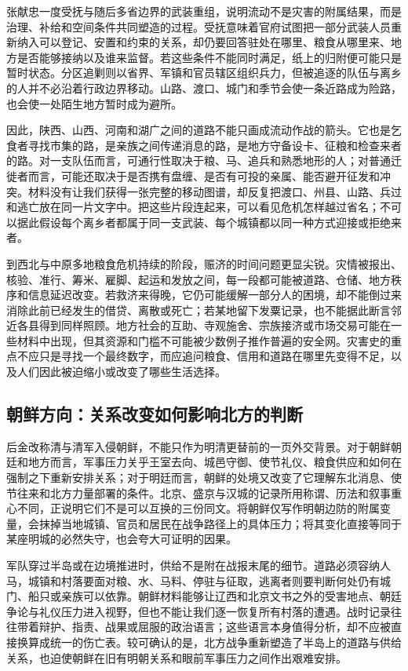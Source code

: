 张献忠一度受抚与随后多省边界的武装重组，说明流动不是灾害的附属结果，而是治理、补给和空间条件共同塑造的过程。受抚意味着官府试图把一部分武装人员重新纳入可以登记、安置和约束的关系，却仍要回答驻处在哪里、粮食从哪里来、地方是否能够接纳以及谁来监督。若这些条件不能同时满足，纸上的归附便可能只是暂时状态。分区追剿则以省界、军镇和官员辖区组织兵力，但被追逐的队伍与离乡的人并不必沿着行政边界移动。山路、渡口、城门和季节会使一条近路成为险路，也会使一处陌生地方暂时成为避所。

因此，陕西、山西、河南和湖广之间的道路不能只画成流动作战的箭头。它也是乞食者寻找市集的路，是亲族之间传递消息的路，是地方守备设卡、征粮和检查来者的路。对一支队伍而言，可通行性取决于粮、马、追兵和熟悉地形的人；对普通迁徙者而言，可能还取决于是否携有盘缠、是否有可投的亲属、能否避开征发和冲突。材料没有让我们获得一张完整的移动图谱，却反复把渡口、州县、山路、兵过和逃亡放在同一片文字中。把这些片段连起来，可以看见危机怎样越过省名；不可以据此假设每个离乡者都属于同一支武装、每个城镇都以同一种方式迎接或拒绝来者。

到西北与中原多地粮食危机持续的阶段，赈济的时间问题更显尖锐。灾情被报出、核验、准行、筹米、雇脚、起运和发放之间，每一段都可能被道路、仓储、地方秩序和信息延迟改变。若救济来得晚，它仍可能缓解一部分人的困境，却不能倒过来消除此前已经发生的借贷、离散或死亡；若某地留下发粟记录，也不能据此断言邻近各县得到同样照顾。地方社会的互助、寺观施舍、宗族接济或市场交易可能在一些材料中出现，但其资源和门槛不可能被少数例子推作普遍的安全网。灾害史的重点不应只是寻找一个最终数字，而应追问粮食、信用和道路在哪里先变得不足，以及人们因此被迫缩小或改变了哪些生活选择。

\subsection{朝鲜方向：关系改变如何影响北方的判断}

后金改称清与清军入侵朝鲜，不能只作为明清更替前的一页外交背景。对于朝鲜朝廷和地方而言，军事压力关乎王室去向、城邑守御、使节礼仪、粮食供应和如何在强制之下重新安排关系；对于明廷而言，朝鲜的处境又改变了它理解东北消息、使节往来和北方力量部署的条件。北京、盛京与汉城的记录所用称谓、历法和叙事重心不同，正说明它们不是可以互换的三份同文。将朝鲜仅写作明朝边防的附属变量，会抹掉当地城镇、官员和居民在战争路径上的具体压力；将其变化直接等同于某座明城的必然失守，也会夸大可证明的因果。

军队穿过半岛或在边境推进时，供给不是附在战报末尾的细节。道路必须容纳人马，城镇和村落要面对粮、水、马料、停驻与征取，逃离者则要判断何处仍有城门、船只或亲族可以依靠。朝鲜材料能够让辽西和北京文书之外的受害地点、朝廷争论与礼仪压力进入视野，但也不能让我们逐一恢复所有村落的遭遇。战时记录往往带着辩护、指责、战果或屈服的政治语言；这些语言本身值得分析，却不应被直接换算成统一的伤亡表。较可确认的是，北方战争重新塑造了半岛上的道路与供给关系，也迫使朝鲜在旧有明朝关系和眼前军事压力之间作出艰难安排。

